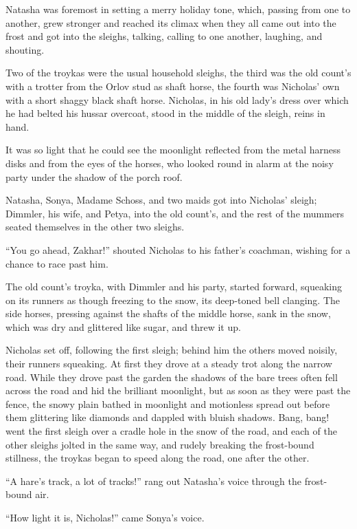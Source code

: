 Natasha was foremost in setting a merry holiday tone, which,
passing from one to another, grew stronger and reached its climax
when they all came out into the frost and got into the sleighs,
talking, calling to one another, laughing, and shouting.

Two of the troykas were the usual household sleighs, the third
was the old count's with a trotter from the Orlov stud as shaft
horse, the fourth was Nicholas' own with a short shaggy black
shaft horse.  Nicholas, in his old lady's dress over which he had
belted his hussar overcoat, stood in the middle of the sleigh,
reins in hand.

It was so light that he could see the moonlight reflected from
the metal harness disks and from the eyes of the horses, who
looked round in alarm at the noisy party under the shadow of the
porch roof.

Natasha, Sonya, Madame Schoss, and two maids got into Nicholas'
sleigh; Dimmler, his wife, and Petya, into the old count's, and
the rest of the mummers seated themselves in the other two
sleighs.

``You go ahead, Zakhar!'' shouted Nicholas to his father's
coachman, wishing for a chance to race past him.

The old count's troyka, with Dimmler and his party, started
forward, squeaking on its runners as though freezing to the snow,
its deep-toned bell clanging. The side horses, pressing against
the shafts of the middle horse, sank in the snow, which was dry
and glittered like sugar, and threw it up.

Nicholas set off, following the first sleigh; behind him the
others moved noisily, their runners squeaking. At first they
drove at a steady trot along the narrow road. While they drove
past the garden the shadows of the bare trees often fell across
the road and hid the brilliant moonlight, but as soon as they
were past the fence, the snowy plain bathed in moonlight and
motionless spread out before them glittering like diamonds and
dappled with bluish shadows. Bang, bang! went the first sleigh
over a cradle hole in the snow of the road, and each of the other
sleighs jolted in the same way, and rudely breaking the
frost-bound stillness, the troykas began to speed along the road,
one after the other.

``A hare's track, a lot of tracks!'' rang out Natasha's voice
through the frost-bound air.

``How light it is, Nicholas!'' came Sonya's voice.

